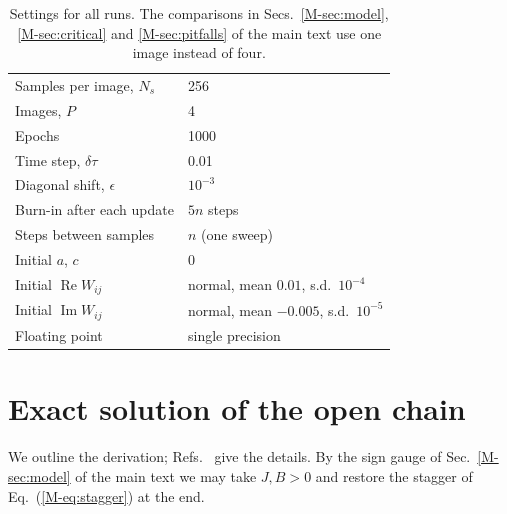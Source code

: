 \documentclass[aps,prb,preprint,amsmath,amssymb,nofootinbib,longbibliography]{revtex4-2}
\newcommand{\dtau}{\delta\tau}
\renewcommand{\Re}{\operatorname{Re}}
\renewcommand{\Im}{\operatorname{Im}}
\begin{document}
\begin{table}[h]
\caption{Settings for all runs. The comparisons in Secs.~\ref{M-sec:model}, \ref{M-sec:critical} and
\ref{M-sec:pitfalls} of the main text use one image instead of four.}
\label{tab:settings}
\begin{ruledtabular}
\begin{tabular}{ll}
Samples per image, $N_s$ & 256 \\
Images, $P$ & 4 \\
Epochs & 1000 \\
Time step, $\dtau$ & 0.01 \\
Diagonal shift, $\epsilon$ & $10^{-3}$ \\
Burn-in after each update & $5n$ steps \\
Steps between samples & $n$ (one sweep) \\
Initial $a$, $c$ & 0 \\
Initial $\Re W_{ij}$ & normal, mean $0.01$, s.d.\ $10^{-4}$ \\
Initial $\Im W_{ij}$ & normal, mean $-0.005$, s.d.\ $10^{-5}$ \\
Floating point & single precision \\
\end{tabular}
\end{ruledtabular}
\end{table}

\section{Exact solution of the open chain}
\label{sec:exact}

We outline the derivation; Refs.~ give the details. By the sign gauge of
Sec.~\ref{M-sec:model} of the main text we may take $J, B > 0$ and restore the stagger of
Eq.~(\ref{M-eq:stagger}) at the end.
\end{document}
